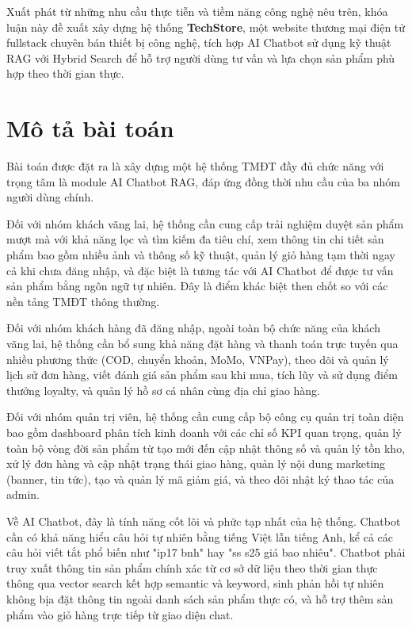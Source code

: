 Xuất phát từ những nhu cầu thực tiễn và tiềm năng công nghệ nêu trên, khóa luận này đề xuất xây dựng hệ thống \textbf{TechStore}, một website thương mại điện tử fullstack chuyên bán thiết bị công nghệ, tích hợp AI Chatbot sử dụng kỹ thuật RAG với Hybrid Search để hỗ trợ người dùng tư vấn và lựa chọn sản phẩm phù hợp theo thời gian thực.

\section{Mô tả bài toán}

Bài toán được đặt ra là xây dựng một hệ thống TMĐT đầy đủ chức năng với trọng tâm là module AI Chatbot RAG, đáp ứng đồng thời nhu cầu của ba nhóm người dùng chính.

Đối với nhóm khách vãng lai, hệ thống cần cung cấp trải nghiệm duyệt sản phẩm mượt mà với khả năng lọc và tìm kiếm đa tiêu chí, xem thông tin chi tiết sản phẩm bao gồm nhiều ảnh và thông số kỹ thuật, quản lý giỏ hàng tạm thời ngay cả khi chưa đăng nhập, và đặc biệt là tương tác với AI Chatbot để được tư vấn sản phẩm bằng ngôn ngữ tự nhiên. Đây là điểm khác biệt then chốt so với các nền tảng TMĐT thông thường.

Đối với nhóm khách hàng đã đăng nhập, ngoài toàn bộ chức năng của khách vãng lai, hệ thống cần bổ sung khả năng đặt hàng và thanh toán trực tuyến qua nhiều phương thức (COD, chuyển khoản, MoMo, VNPay), theo dõi và quản lý lịch sử đơn hàng, viết đánh giá sản phẩm sau khi mua, tích lũy và sử dụng điểm thưởng loyalty, và quản lý hồ sơ cá nhân cùng địa chỉ giao hàng.

Đối với nhóm quản trị viên, hệ thống cần cung cấp bộ công cụ quản trị toàn diện bao gồm dashboard phân tích kinh doanh với các chỉ số KPI quan trọng, quản lý toàn bộ vòng đời sản phẩm từ tạo mới đến cập nhật thông số và quản lý tồn kho, xử lý đơn hàng và cập nhật trạng thái giao hàng, quản lý nội dung marketing (banner, tin tức), tạo và quản lý mã giảm giá, và theo dõi nhật ký thao tác của admin.

Về AI Chatbot, đây là tính năng cốt lõi và phức tạp nhất của hệ thống. Chatbot cần có khả năng hiểu câu hỏi tự nhiên bằng tiếng Việt lẫn tiếng Anh, kể cả các câu hỏi viết tắt phổ biến như "ip17 bnh" hay "ss s25 giá bao nhiêu". Chatbot phải truy xuất thông tin sản phẩm chính xác từ cơ sở dữ liệu theo thời gian thực thông qua vector search kết hợp semantic và keyword, sinh phản hồi tự nhiên không bịa đặt thông tin ngoài danh sách sản phẩm thực có, và hỗ trợ thêm sản phẩm vào giỏ hàng trực tiếp từ giao diện chat.

